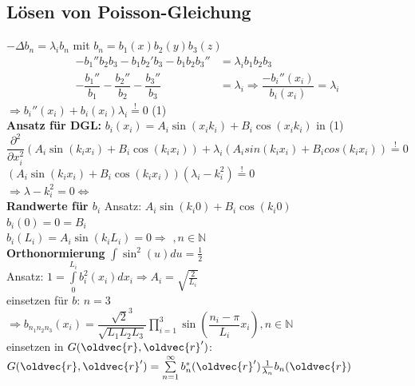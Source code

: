 \documentclass[6pt,a4paper]{scrartcl}
\let\vec\oldvec
\begin{document}
\begin{multicols}{4}
	\subsection{Lösen von Poisson-Gleichung}
	$-\Delta b_n = \lambda_ib_n$ mit $b_n=b_1(x)b_2(y)b_3(z)$
	\begin{align*}
		-b_1''b_2b_3-b_1b_2'b_3-b_1b_2b_3''&=\lambda_ib_1b_2b_3\\
		-\dfrac{b_1''}{b_1}-\dfrac{b_2''}{b_2}-\dfrac{b_3''}{b_3}&=\lambda_i \Rightarrow \dfrac{-b_i''(x_i)}{b_i(x_i)}=\lambda_i
	\end{align*}
	$\Rightarrow b_i''(x_i)+b_i(x_i)\lambda_i \stackrel{!}{=} 0$ \qquad (1)\\
	\textbf{Ansatz für DGL: } $b_i(x_i)=A_i\sin(x_ik_i)+B_i\cos(x_ik_i)$ \quad in (1)\\
	$\dfrac{\partial^2}{\partial x_i^2}(A_i\sin(k_ix_i)+B_i\cos(k_ix_i))+\lambda_i(A_isin(k_ix_i)+B_icos(k_ix_i)) \stackrel{!}{=} 0$\\
	$(A_i\sin(k_ix_i)+B_i\cos(k_ix_i))(\lambda_i-k_i^2)\stackrel{!}{=}0$\\
	$\Rightarrow \lambda-k_i^2=0 \Leftrightarrow$  \\
	\textbf{Randwerte für $b_i$}
	Ansatz: $A_i\sin(k_i 0)+B_i\cos(k_i 0)$\\
	$b_i(0)=0=B_i$\\
	$b_i(L_i)=A_i\sin(k_iL_i)=0\Rightarrow$ $, n\in \mathbb{N}$\\
	\textbf{Orthonormierung}
	$\int\sin^2(u)du=\frac{1}{2}$\\
	Ansatz: $1 = \int\limits_0^{L_i}b_i^2(x_i)dx_i\Rightarrow A_i=\sqrt{\frac{2}{L_i}}$\\
	einsetzen für $b$: $n=3$\\$\Rightarrow b_{n_1n_2n_3}(x_i)=\dfrac{\sqrt{2}^3}{\sqrt{L_1L_2L_3}}\prod\limits_{i=1}^3\sin\left(\dfrac{n_i-\pi}{L_i}x_i\right), n\in\mathbb{N}$\\
	einsetzen in $G(\vec{r},\vec{r}')$: $G(\vec{r},\vec{r}') = \sum\limits_{n=1}^{\infty}b_n^*(\vec{r}')\frac{1}{\lambda_n}b_n(\vec{r})$

\end{multicols}
\end{document}
